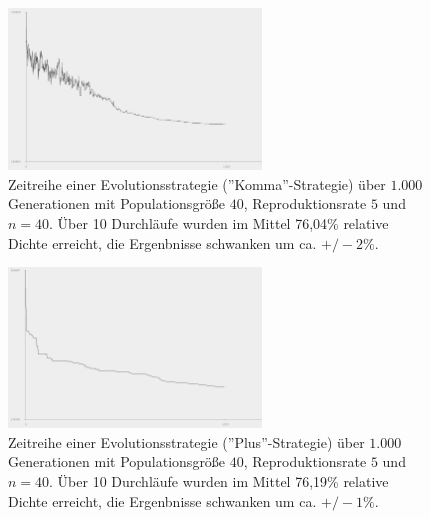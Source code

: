 \documentclass[twoside,bibtotoc]{report}
\begin{document}
\begin{figure}[H]
 \centering
 \includegraphics [width=0.6\textwidth]{Bilder/Strategy_komma_40_5.png}
 \caption{
 	Zeitreihe einer Evolutionsstrategie (''Komma''-Strategie) über $1.000$ Generationen mit Populationsgröße $40$,
 	Reproduktionsrate $5$ und $n = 40$.
 	Über 10 Durchläufe wurden im Mittel 76,04\% relative Dichte erreicht,
 	die Ergenbnisse schwanken um ca. $+/- 2\%$.
 	}
 \label{fig:strategy_komma_40_5}
\end{figure}
 
\begin{figure}[H]
 \centering
 \includegraphics [width=0.6\textwidth]{Bilder/Strategy_plus_40_5.png}
 \caption{
 	Zeitreihe einer Evolutionsstrategie (''Plus''-Strategie) über $1.000$ Generationen mit Populationsgröße $40$,
 	Reproduktionsrate $5$ und $n = 40$.
 	Über 10 Durchläufe wurden im Mittel 76,19\% relative Dichte erreicht,
 	die Ergenbnisse schwanken um ca. $+/- 1\%$.
 	}
 \label{fig:strategy_plus_40_5}
\end{figure}
\end{document}
